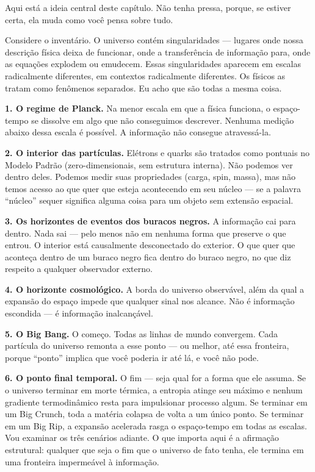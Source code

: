 \documentclass[11pt, twoside, openright]{book}
\begin{document}
Aqui está a ideia central deste capítulo. Não tenha pressa, porque, se estiver certa, ela muda como você pensa sobre tudo.

Considere o inventário. O universo contém singularidades --- lugares onde nossa descrição física deixa de funcionar, onde a transferência de informação para, onde as equações explodem ou emudecem. Essas singularidades aparecem em escalas radicalmente diferentes, em contextos radicalmente diferentes. Os físicos as tratam como fenômenos separados. Eu acho que são todas a mesma coisa.

\textbf{1. O regime de Planck.} Na menor escala em que a física funciona, o espaço-tempo se dissolve em algo que não conseguimos descrever. Nenhuma medição abaixo dessa escala é possível. A informação não consegue atravessá-la.

\textbf{2. O interior das partículas.} Elétrons e quarks são tratados como pontuais no Modelo Padrão (zero-dimensionais, sem estrutura interna). Não podemos ver dentro deles. Podemos medir suas propriedades (carga, spin, massa), mas não temos acesso ao que quer que esteja acontecendo em seu núcleo --- se a palavra ``núcleo'' sequer significa alguma coisa para um objeto sem extensão espacial.

\textbf{3. Os horizontes de eventos dos buracos negros.} A informação cai para dentro. Nada sai --- pelo menos não em nenhuma forma que preserve o que entrou. O interior está causalmente desconectado do exterior. O que quer que aconteça dentro de um buraco negro fica dentro do buraco negro, no que diz respeito a qualquer observador externo.

\textbf{4. O horizonte cosmológico.} A borda do universo observável, além da qual a expansão do espaço impede que qualquer sinal nos alcance. Não é informação escondida --- é informação inalcançável.

\textbf{5. O Big Bang.} O começo. Todas as linhas de mundo convergem. Cada partícula do universo remonta a esse ponto --- ou melhor, até essa fronteira, porque ``ponto'' implica que você poderia ir até lá, e você não pode.

\textbf{6. O ponto final temporal.} O fim --- seja qual for a forma que ele assuma. Se o universo terminar em morte térmica, a entropia atinge seu máximo e nenhum gradiente termodinâmico resta para impulsionar processo algum. Se terminar em um Big Crunch, toda a matéria colapsa de volta a um único ponto. Se terminar em um Big Rip, a expansão acelerada rasga o espaço-tempo em todas as escalas. Vou examinar os três cenários adiante. O que importa aqui é a afirmação estrutural: qualquer que seja o fim que o universo de fato tenha, ele termina em uma fronteira impermeável à informação.
\end{document}
